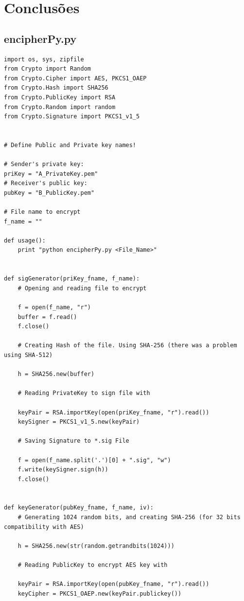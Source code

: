 \documentclass[a4paper,11pt,openright,oneside]{report}
\begin{document}
\chapter{Conclusões}
\label{chap.conclusões}

\appendix
\newpage
\section{encipherPy.py} \label{App:encipher.py}

\begin{verbatim}
import os, sys, zipfile
from Crypto import Random
from Crypto.Cipher import AES, PKCS1_OAEP
from Crypto.Hash import SHA256
from Crypto.PublicKey import RSA
from Crypto.Random import random
from Crypto.Signature import PKCS1_v1_5


# Define Public and Private key names!

# Sender's private key:
priKey = "A_PrivateKey.pem"
# Receiver's public key:
pubKey = "B_PublicKey.pem"

# File name to encrypt
f_name = ""

def usage():
    print "python encipherPy.py <File_Name>"


def sigGenerator(priKey_fname, f_name):
    # Opening and reading file to encrypt

    f = open(f_name, "r")
    buffer = f.read()
    f.close()

    # Creating Hash of the file. Using SHA-256 (there was a problem using SHA-512)

    h = SHA256.new(buffer)

    # Reading PrivateKey to sign file with

    keyPair = RSA.importKey(open(priKey_fname, "r").read())
    keySigner = PKCS1_v1_5.new(keyPair)

    # Saving Signature to *.sig File

    f = open(f_name.split('.')[0] + ".sig", "w")
    f.write(keySigner.sign(h))
    f.close()


def keyGenerator(pubKey_fname, f_name, iv):
    # Generating 1024 random bits, and creating SHA-256 (for 32 bits compatibility with AES)

    h = SHA256.new(str(random.getrandbits(1024)))

    # Reading PublicKey to encrypt AES key with

    keyPair = RSA.importKey(open(pubKey_fname, "r").read())
    keyCipher = PKCS1_OAEP.new(keyPair.publickey())


\end{verbatim}
\end{document}
